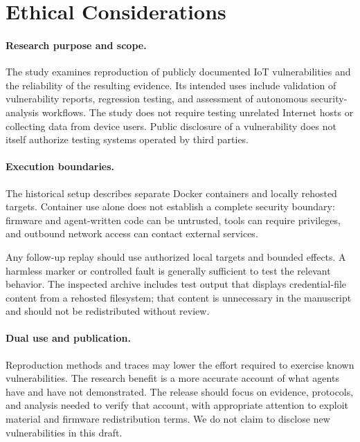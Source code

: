 \section{Ethical Considerations}
\label{app:ethics}

\paragraph{Research purpose and scope.}
The study examines reproduction of publicly documented IoT vulnerabilities
and the reliability of the resulting evidence. Its intended uses include
validation of vulnerability reports, regression testing, and assessment
of autonomous security-analysis workflows. The study does not require
testing unrelated Internet hosts or collecting data from device users.
Public disclosure of a vulnerability does not itself authorize testing
systems operated by third parties.

\paragraph{Execution boundaries.}
The historical setup describes separate Docker containers and locally
rehosted targets. Container use alone does not establish a complete
security boundary: firmware and agent-written code can be untrusted,
tools can require privileges, and outbound network access can contact
external services. 

Any follow-up replay should use authorized local targets and bounded
effects. A harmless marker or controlled fault is generally sufficient to
test the relevant behavior. The inspected archive includes test output
that displays credential-file content from a rehosted filesystem; that
content is unnecessary in the manuscript and should not be redistributed
without review. 

\paragraph{Dual use and publication.}
Reproduction methods and traces may lower the effort required to exercise
known vulnerabilities. The research benefit is a more accurate account of
what agents have and have not demonstrated. The release should focus on
evidence, protocols, and analysis needed to verify that account, with
appropriate attention to exploit material and firmware redistribution
terms. We do not claim to disclose new vulnerabilities in this draft.


